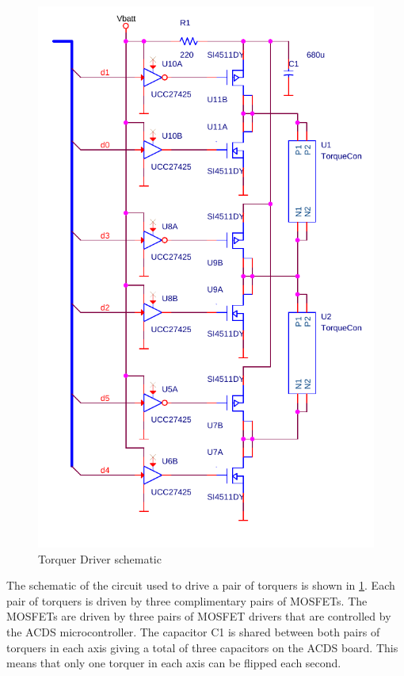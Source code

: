 \begin{figure}[htb!]
    \centering
    \includegraphics[height=0.5\textheight]{Figures/driverSchematic}
    \caption{Torquer Driver schematic}
    \label{fig:drive}
\end{figure}

The schematic of the circuit used to drive a pair of torquers is shown in \cref{fig:drive}. Each pair of torquers is driven by three complimentary pairs of \acp{MOSFET}.  The \acp{MOSFET} are driven by three pairs of \ac{MOSFET} drivers that are controlled by the \ac{ACDS} microcontroller. The capacitor C1 is shared between both pairs of torquers in each axis giving a total of three capacitors on the \ac{ACDS} board. This means that only one torquer in each axis can be flipped each second. 

